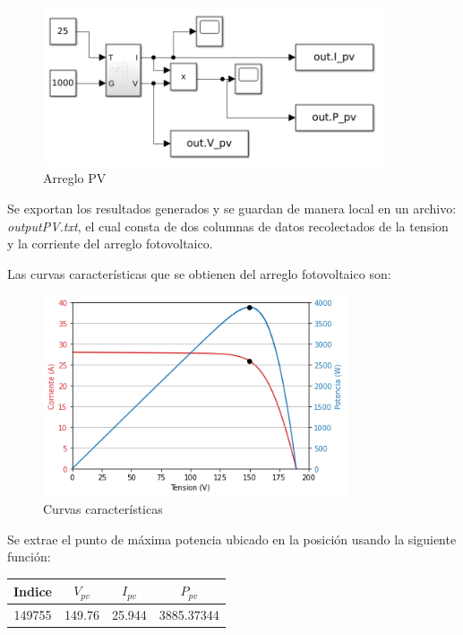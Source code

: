 \documentclass[a4paper,12pt]{article}
\begin{document}
	\begin{figure}[htb]
		\centering
		\includegraphics[width=0.9\textwidth]{./imagenes/simulink1.png}
		\caption{Arreglo PV}
	\end{figure} 
	
	Se exportan los resultados generados y se guardan de manera local en un archivo: \textit{outputPV.txt}, el cual consta de dos columnas de datos recolectados de la tension y la corriente del arreglo fotovoltaico. \newline
	
	Las curvas características que se obtienen del arreglo fotovoltaico son:
		
	
		
		\begin{figure}[htb]
			\centering
			\includegraphics[width=0.8\textwidth]{./imagenes/curvacaracteristica.png}
			\caption{Curvas características}
		\end{figure} 
	
	Se extrae el punto de máxima potencia ubicado en la posición usando la siguiente función:
	
	
	
	\begin{tabular}{| c | c | c | c |}
		\hline
		Indice & $V_{pv}$ & $I_{pv}$ & $P_{pv}$ \\ \hline
		149755 & 149.76 & 25.944 & 3885.37344 \\ \hline
	\end{tabular}
\end{document}
